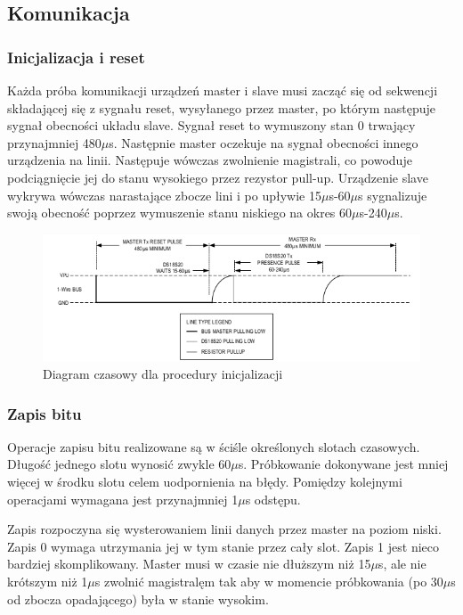 \documentclass[a4paper]{article}
\begin{document}
\subsection{Komunikacja}

\subsubsection{Inicjalizacja i reset}

Każda próba komunikacji urządzeń master i slave musi zacząć się od sekwencji składającej się z sygnału reset, wysyłanego przez master, po którym następuje sygnał obecności układu slave. Sygnał reset to wymuszony stan 0 trwający przynajmniej 480$\mu$s. Następnie master oczekuje na sygnał obecności innego urządzenia na linii. Następuje wówczas zwolnienie magistrali, co powoduje podciągnięcie jej do stanu wysokiego przez rezystor pull-up. Urządzenie slave wykrywa wówczas narastające zbocze lini i po upływie 15$\mu$s-60$\mu$s sygnalizuje swoją obecność poprzez wymuszenie stanu niskiego na okres 60$\mu$s-240$\mu$s.

\begin{figure}[H]
\begin{center}
\includegraphics[scale=0.4]{graphics/init.png}
\end{center}
\caption{Diagram czasowy dla procedury inicjalizacji}
\label{inititming}
\end{figure}

\subsubsection{Zapis bitu}
Operacje zapisu bitu realizowane są w ściśle określonych slotach czasowych. Długość jednego slotu wynosić zwykle 60$\mu$s. Próbkowanie dokonywane jest mniej więcej w środku slotu celem uodpornienia na błędy. Pomiędzy kolejnymi operacjami wymagana jest przynajmniej 1$\mu$s odstępu.

Zapis rozpoczyna się wysterowaniem linii danych przez master na poziom niski. Zapis 0 wymaga utrzymania jej w tym stanie przez cały slot. Zapis 1 jest nieco bardziej skomplikowany. Master musi w czasie nie dłuższym niż 15$\mu$s, ale nie krótszym niż 1$\mu$s zwolnić magistralęm tak aby w momencie próbkowania (po 30$\mu$s od zbocza opadającego) była w stanie wysokim. 
\end{document}

